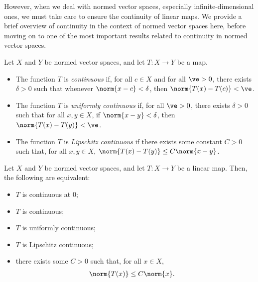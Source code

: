 \documentclass[10pt]{mypackage2}
\begin{document}
However, when we deal with normed vector spaces, especially infinite-dimensional ones, we must take care to ensure the continuity of linear maps. We provide a brief overview of continuity in the context of normed vector spaces here, before moving on to one of the most important results related to continuity in normed vector spaces.
\begin{definition}
  Let $X$ and $Y$ be normed vector spaces, and let $T\colon X\rightarrow Y$ be a map.
  \begin{itemize}
    \item The function $T$ is \textit{continuous} if, for all $c\in X$ and for all $\ve > 0$, there exists $\delta > 0$ such that whenever $\norm{x-c} < \delta$, then $\norm{T(x) - T(c)} < \ve$.
    \item The function $T$ is \textit{uniformly continuous} if, for all $\ve > 0$, there exists $\delta > 0 $ such that for all $x,y\in X$, if $\norm{x-y} < \delta$, then $\norm{T(x) - T(y)} < \ve$.
    \item The function $T$ is \textit{Lipschitz continuous} if there exists some constant $C > 0$ such that, for all $x,y\in X$, $\norm{T(x)-T(y)}\leq C\norm{x-y}$.
  \end{itemize}
\end{definition}
\begin{theorem}
  Let $X$ and $Y$ be normed vector spaces, and let $T\colon X\rightarrow Y$ be a linear map. Then, the following are equivalent:
  \begin{itemize}
    \item $T$ is continuous at $0$;
    \item $T$ is continuous;
    \item $T$ is uniformly continuous;
    \item $T$ is Lipschitz continuous;
    \item there exists some $C > 0$ such that, for all $x\in X$,
      \begin{align*}
        \norm{T(x)} &\leq C\norm{x}.
      \end{align*}
  \end{itemize}
\end{theorem}
\end{document}
